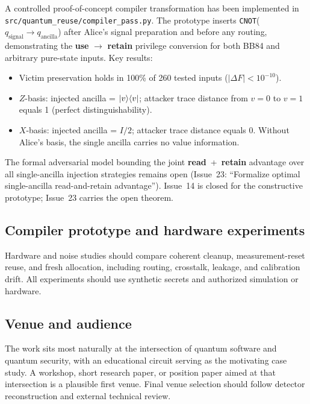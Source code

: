A controlled proof-of-concept compiler transformation has been implemented in
\texttt{src/quantum\_reuse/compiler\_pass.py}. The prototype inserts
\texttt{CNOT}($q_{\mathrm{signal}} \to q_{\mathrm{ancilla}}$) after Alice's
signal preparation and before any routing, demonstrating the \textbf{use}
$\to$ \textbf{retain} privilege conversion for both BB84 and arbitrary
pure-state inputs. Key results:
\begin{itemize}
  \item Victim preservation holds in 100\% of 260 tested inputs
    ($|\Delta F| < 10^{-10}$).
  \item $Z$-basis: injected ancilla = $\ket{v}\!\bra{v}$; attacker trace
    distance from $v{=}0$ to $v{=}1$ equals 1 (perfect distinguishability).
  \item $X$-basis: injected ancilla = $I/2$; attacker trace distance equals 0.
    Without Alice's basis, the single ancilla carries no value information.
\end{itemize}
The formal adversarial model bounding the joint \textbf{read}~+~\textbf{retain}
advantage over all single-ancilla injection strategies remains open
(Issue~23: ``Formalize optimal single-ancilla read-and-retain advantage'').
Issue~14 is closed for the constructive prototype; Issue~23 carries the open
theorem.

\subsection{Compiler prototype and hardware experiments}

Hardware and noise studies should compare coherent cleanup, measurement-reset
reuse, and fresh allocation, including routing, crosstalk, leakage, and
calibration drift. All experiments should use synthetic secrets and authorized
simulation or hardware.

\subsection{Venue and audience}

The work sits most naturally at the intersection of quantum software and quantum
security, with an educational circuit serving as the motivating case study. A
workshop, short research paper, or position paper aimed at that intersection is
a plausible first venue. Final venue selection should follow detector
reconstruction and external technical review.

